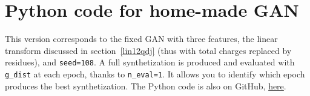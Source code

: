 \documentclass[oneside,10pt]{book}
\begin{document}
\section{Python code for home-made GAN}

This version corresponds to the fixed GAN with three features, the linear transform discussed in section~\ref{lin12qdj} (thus with total charges replaced by residues), and \texttt{seed=108}. A full synthetization is produced and evaluated with
 \texttt{g\_dist} at each epoch,
 thanks to \texttt{n\_eval=1}. It allows you to identify which epoch produces the best synthetization.
 The Python code is also on GitHub, \href{https://github.com/VincentGranville/Main/blob/main/GAN_telecom.py}{here}. \vspace{1ex}






\end{document}
